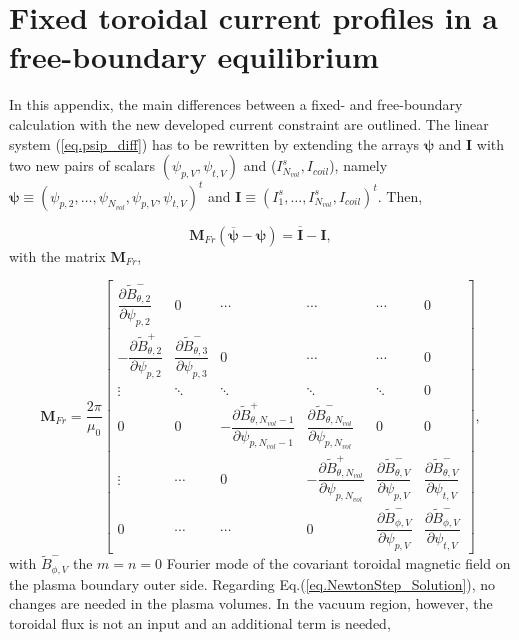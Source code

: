 \chapter{Fixed toroidal current profiles in a free-boundary equilibrium}\label{appA}

In this appendix, the main differences between a fixed- and free-boundary calculation with the new developed current constraint are outlined. The linear system (\ref{eq.psip_diff}) has to be rewritten by extending the arrays $\bm{\psi}$ and $\mathbf{I}$ with two new pairs of scalars $(\psi_{p,V}, \psi_{t,V})$ and ($I^s_{N_{vol}}, I_{coil}$), namely $\bm{\psi}\equiv(\psi_{p,2},\ldots,\psi_{N_{vol}}, \psi_{p,V}, \psi_{t,V})^t$ and $\bm{I}\equiv(I^s_1,\ldots,I^s_{N_{vol}},I_{coil})^t$. Then,

\begin{equation}
	\mathbf{M}_{Fr} (\overbar{\bm{\psi}} - \bm{\psi}) = \overbar{\bm{I}} - \bm{I},
\end{equation}
with the matrix $\mathbf{M}_{Fr}$,

\begin{equation}
	\mathbf{M}_{Fr} = \frac{2\pi}{\mu_0} \begin{bmatrix}
		\dfrac{\partial \tilde{B}^-_{\theta,2}}{\partial{\psi_{p,2}}} & 0 & \cdots  & \cdots & \cdots & 0\\
		-\dfrac{\partial \tilde{B}^+_{\theta,2}}{\partial{\psi_{p,2}}} & \dfrac{\partial \tilde{B}^-_{\theta,3}}{\partial{\psi_{p,3}}} & 0  & \cdots & \cdots & 0\\
		\vdots  & \ddots  & \ddots & \ddots & \ddots & 0\\
		0 & 0 & -\dfrac{\partial \tilde{B}^+_{\theta,N_{vol}-1}}{\partial{\psi_{p,N_{vol}-1}}} & \dfrac{\partial \tilde{B}^-_{\theta,N_{vol}}}{\partial{\psi_{p,N_{vol}}}} & 0 & 0 \\
		\vdots & \cdots & 0 & -\dfrac{\partial \tilde{B}^+_{\theta,N_{vol}}}{\partial{\psi_{p,N_{vol}}}} & \dfrac{\partial \tilde{B}^-_{\theta,V}}{\partial{\psi_{p,V}}} & \dfrac{\partial \tilde{B}^-_{\theta,V}}{\partial{\psi_{t,V}}} \\
		0 & \cdots & \cdots & 0 & \dfrac{\partial \tilde{B}_{\phi,V}^-}{\partial \psi_{p,V}} & \dfrac{\partial \tilde{B}_{\phi,V}^-}{\partial \psi_{t,V}}
	\end{bmatrix},
\end{equation}
with $\tilde{B}^-_{\phi,V}$ the $m=n=0$ Fourier mode of the covariant toroidal magnetic field on the plasma boundary outer side. Regarding Eq.(\ref{eq.NewtonStep_Solution}), no changes are needed in the plasma volumes. In the vacuum region, however, the toroidal flux is not an input and an additional term is needed,

